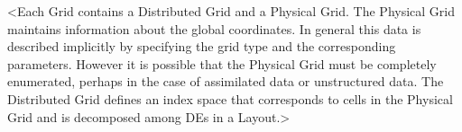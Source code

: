%


<Each Grid contains a Distributed Grid and a Physical Grid. The Physical Grid
maintains information about the global coordinates. In general this data is
described implicitly by specifying the grid type and the corresponding
parameters. However it is possible that the Physical Grid must be completely
enumerated, perhaps in the case of assimilated data or unstructured data. The
Distributed Grid defines an index space that corresponds to cells in the Physical
Grid and is decomposed among DEs in a Layout.>


